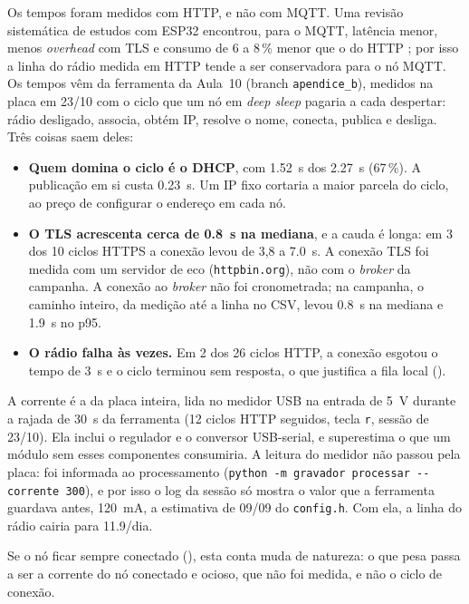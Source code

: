 Os tempos foram medidos com HTTP, e não com MQTT. Uma revisão
sistemática de estudos com ESP32 encontrou, para o MQTT, latência menor,
menos \emph{overhead} com TLS e consumo de 6 a 8\,\% menor que o do
HTTP \cite{adriansyah2026mqtt}; por isso a linha do rádio medida em
HTTP tende a ser conservadora para o nó MQTT. Os tempos vêm da
ferramenta da Aula~10 (branch \texttt{apendice\_b}),
medidos na placa em 23/10 com o ciclo que um nó em \emph{deep sleep}
pagaria a cada despertar: rádio desligado, associa, obtém IP, resolve o
nome, conecta, publica e desliga. Três coisas saem deles:

\begin{itemize}
  \item \textbf{Quem domina o ciclo é o DHCP}, com \SI{1,52}{\second} dos
    \SI{2,27}{\second} (67\,\%). A publicação em si custa
    \SI{0,23}{\second}. Um IP fixo cortaria a maior parcela do ciclo, ao
    preço de configurar o endereço em cada nó.
  \item \textbf{O TLS acrescenta cerca de \SI{0,8}{\second} na mediana},
    e a cauda é longa: em 3 dos 10 ciclos HTTPS a conexão levou de 3,8 a
    \SI{7,0}{\second}. A conexão TLS foi medida com um servidor de eco
    (\texttt{httpbin.org}), não com o \emph{broker} da campanha. A
    conexão ao \emph{broker} não foi cronometrada; na campanha, o
    caminho inteiro, da medição até a linha no CSV, levou
    \SI{0,8}{\second} na mediana e \SI{1,9}{\second} no p95.
  \item \textbf{O rádio falha às vezes.} Em 2 dos 26 ciclos HTTP, a
    conexão esgotou o tempo de \SI{3}{\second} e o ciclo terminou sem
    resposta, o que justifica a fila local ().
\end{itemize}

A corrente é a da placa inteira, lida no medidor USB na entrada de
\SI{5}{\volt} durante a rajada de \SI{30}{\second} da ferramenta
(12 ciclos HTTP seguidos, tecla \texttt{r}, sessão de 23/10). Ela inclui
o regulador e o conversor USB-serial, e superestima o que um módulo sem
esses componentes consumiria. A leitura do medidor não passou pela
placa: foi informada ao processamento (\texttt{python -m gravador
processar -{}-corrente 300}), e por isso o log da sessão só mostra o
valor que a ferramenta guardava antes, \SI{120}{\milli\ampere}, a
estimativa de 09/09 do \texttt{config.h}. Com ela, a linha do rádio
cairia para \SI{11,9}{\mAh}/dia.

Se o nó ficar sempre conectado (), esta conta muda de natureza: o
que pesa passa a ser a corrente do nó conectado e ocioso, que não foi
medida, e não o ciclo de conexão.

